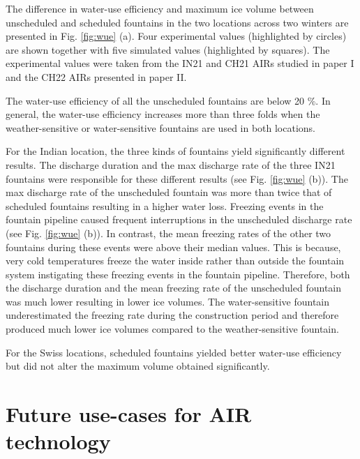 The difference in water-use efficiency and maximum ice volume between unscheduled and scheduled fountains in the two
locations across two winters are presented in Fig. \ref{fig:wue} (a). Four experimental values (highlighted by
circles) are shown together with five simulated values (highlighted by squares).  The experimental values were
taken from the IN21 and CH21 AIRs studied in paper I and
the CH22 AIRs presented in paper II. 

The water-use efficiency of all the unscheduled fountains are below 20 \%. In general, the water-use efficiency
increases more than three folds when the weather-sensitive or water-sensitive fountains are used in both
locations.  

For the Indian location, the three kinds of fountains yield significantly different results.  The discharge
duration and the max discharge rate of the three IN21 fountains were responsible for these different results
(see Fig. \ref{fig:wue} (b)). The max discharge rate of the unscheduled fountain was more than twice that of
scheduled fountains resulting in a higher water loss. Freezing events in the fountain pipeline caused frequent
interruptions in the unscheduled discharge rate (see Fig. \ref{fig:wue} (b)). In contrast, the mean freezing
rates of the other two fountains during these events were above their median values. This is because, very cold
temperatures freeze the water inside rather than outside the fountain system instigating these freezing events in
the fountain pipeline. Therefore, both the discharge duration and the mean freezing rate of the unscheduled
fountain was much lower resulting in lower ice volumes. The water-sensitive fountain underestimated the freezing
rate during the construction period and therefore produced much lower ice volumes compared to the
weather-sensitive fountain. 

For the Swiss locations, scheduled fountains yielded better water-use efficiency but did not alter the maximum
volume obtained significantly. 

\section{Future use-cases for AIR technology}

